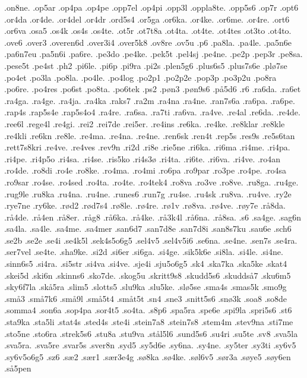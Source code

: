 {.on8ne.
.op5ar
.op4pa
.op4pe
.opp7el
.op4pi
.opp3l
.oppla8te.
.opp5s6
.op7r
.opt6
.or4da
.or4de.
.or4del
.or4dr
.ord5s4
.or5ga
.or6ka.
.or4ke.
.or6me.
.or4re.
.ort6
.or6va
.osa5
.os4k
.os4s
.os4te.
.ot5r
.ot7t8a
.ot4ta.
.ot4te.
.ot4tes
.ot3to
.ot4to.
.ove6
.over3
.overen6d
.over3i4
.over5k8
.ov8re
.ov5u
.p6
.pa8la.
.pa4le.
.pa5n6e
.pa6n7eu
.pa5n6i
.pa6re.
.pe3do
.pe4ke.
.pek5t
.pel4sj
.pe4ne.
.pe2p
.pep3r
.pe8sa.
.pese5t
.pe4st
.ph2
.pi6le.
.pi6p
.pi9ra
.pi2s
.plen5g6
.plus6s5 
.plus7s6e
.plø7se
.po4et
.po3la
.po8la.
.po4le.
.po4log
.po2p1
.po2p2e
.pop3p
.po3p2u
.po8ra
.po6re.
.po4res
.po6st
.po8ta.
.po6tek
.ps2
.pøn3
.pøn9s6
.på5d6
.r6
.ra6da.
.ra6et
.ra4ga.
.ra4ge.
.ra4ja.
.ra4ka
.raks7
.ra2m
.ra4na
.ra4ne.
.ran7s6a
.ra6pa.
.ra6pe.
.rap4s
.rap5s4e
.rap5s4o4
.ra4re.
.ra6sa.
.ra7ti
.ra6va.
.ra4ve.
.re4al
.re6da.
.re4de.
.ree6l
.rege4l
.re4gi.
.rei2
.rei7de
.rei5er.
.re4ins
.re6ka.
.re4ke.
.re8klar
.re8kle
.re4kli
.re6kn
.re8le.
.re4ma.
.re4na.
.re4ne.
.ren6sk
.ren4t
.rep5s
.res9s
.re5s6tan
.rett7s8kri
.re4ve.
.re4ves
.rev9n
.ri2d
.ri8e
.rie5ne
.ri6ka.
.ri6ma
.ri4me.
.ri4pa.
.ri4pe.
.ri4p5o
.ri4sa.
.ri4se.
.ris5ko
.ri4s3ø
.ri4ta.
.ri6te.
.ri6va.
.ri4ve.
.ro4an
.ro4de.
.ro8di
.ro4e
.ro8ke.
.ro4ma.
.ro4mi
.ro6pa
.ro9par
.ro3pe
.ro4pe.
.ro4sa
.ro9sar
.ro4se.
.ro4sed
.ro4ta.
.ro4te.
.ro4tek4
.ro8va
.ro3ve
.ro8ve.
.ru8ga.
.ru4ge.
.rug9le
.ru8ka
.ru4na.
.ru4ne.
.runes6
.run7g
.ru4se.
.ru4sk
.ru8va.
.ru4ve.
.ry2e
.rye7ne
.ry6ke.
.rød2
.rød7s4
.rø8le.
.rø4re.
.rø1v
.rø8va.
.rø4ve.
.røy7e
.rå8da.
.rå4de.
.rå4en
.rå8er.
.råg8
.rå6ka.
.rå4ke.
.rå3k4l
.rå6na.
.rå8sa.
.s6
.sa4ge.
.sag6n
.sa4la.
.sa4le.
.sa4me.
.sa4mer
.san6d7
.san7d8e
.san7d8i
.san8s7ku
.sau6e
.sch6
.se2b
.se2e
.se4i
.se4k5l
.sek4s5o6g5
.sel4v5
.sel4v5i6
.se6na.
.se4ne.
.sen7s
.se4ra.
.ser7vel
.se4te.
.sha9ke.
.si2d
.si6er
.si6ga.
.si4ge.
.sik5k6e
.si8la.
.si4le.
.si4ne.
.sinn6s5
.si4ra.
.si5str
.si4va
.si4ve.
.sje4i
.sju5o6g5
.sk4
.ska7ka
.ska5ke
.skat4
.skei5d
.ski6n
.skinns6
.sko7de.
.skog5u
.skritt9s8
.skudd5s6
.skuddså7
.sku6m5
.sky6f7la
.skå5ra
.slim5
.slotts5
.slu9ka
.slu5ke.
.slø5se
.sma4s
.smas5k
.smo9g
.små3
.små7k6
.små9l
.små5t4
.småt5t
.sn4
.sne3
.snitt5s6
.snø3k
.soa8
.so8de
.somma4
.son6a
.sop4pa
.sor4t5
.so4ta.
.s8p6
.spa5ra
.spe6e
.spi9la
.spri5s6
.st6
.sta9ka
.sta5li
.stat4s
.sted4s
.ste4i
.stein7a8
.stein7s8
.stem4m
.stev9na
.sti7me
.sto5ne
.sto6ra
.strek5s6
.stu8a
.stu9va
.stål5l6
.sund5s6
.su4ri
.su5te
.sv8
.sva5la
.sva5ra.
.sva5re
.svar5s
.sver8n
.syd5 
.sy5d6e
.sy6na.
.sy4ne.
.sy5ter
.sy3ti
.sy6v5
.sy6v5o6g5
.sz6
.sæ2
.sær1
.sær3e4g
.sø8ka
.sø4ke.
.søl6v5
.sør3a
.søye5
.søy6en
.så5pen
}
